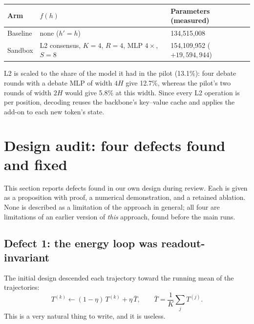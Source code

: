 \documentclass[11pt,a4paper]{article}
\newcommand{\etadim}{\eta}
\theoremstyle{plain}
\theoremstyle{definition}
\theoremstyle{remark}
\begin{document}
\begin{center}
\small
\begin{tabular}{@{}lll@{}}
\toprule
\rowcolor{ekHeadBG}\color{white}\textbf{Arm} & \color{white}\textbf{$f(h)$} & \color{white}\textbf{Parameters (measured)} \\
\midrule
Baseline & none ($h'=h$) & 134{,}515{,}008 \\
Sandbox & L2 consensus, $K{=}4$, $R{=}4$, MLP $4\times$, $S{=}8$ & 154{,}109{,}952 ($+19{,}594{,}944$) \\
\bottomrule
\end{tabular}
\end{center}

\noindent
L2 is scaled to the share of the model it had in the pilot (13.1\%): four
debate rounds with a debate MLP of width $4H$ give 12.7\%, whereas the pilot's
two rounds of width $2H$ would give 5.8\% at this width. Since
every L2 operation is per position, decoding reuses the backbone's key--value
cache and applies the add-on to each new token's state.

\section{Design audit: four defects found and fixed}
\label{sec:audit}

\noindent
This section reports defects found in our own design during review. Each is
given as a proposition with proof, a numerical demonstration, and a retained
ablation. None is described as a limitation of the approach in general; all
four are limitations of an earlier version of \emph{this} approach, found before
the main runs.

\subsection{Defect 1: the energy loop was readout-invariant}
\label{sec:defect1}

\noindent
The initial design descended each trajectory toward the running mean of the
trajectories:
\begin{equation}
  T^{(k)} \leftarrow (1-\etadim)\, T^{(k)} + \etadim\, \bar T,
  \qquad \bar T = \frac{1}{K}\sum_{j} T^{(j)}.
  \label{eq:peer-mean}
\end{equation}
This is a very natural thing to write, and it is useless.
\end{document}
